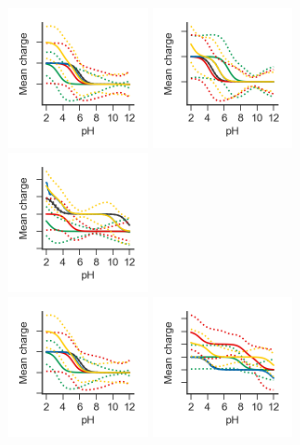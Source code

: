 \documentclass[9pt,lineno,final]{elife}
\begin{document}
\begin{figure}[H]
		\includegraphics[width=0.33\textwidth]{Reports/overview-virtual-titration-SM04.png}
	\includegraphics[width=0.33\textwidth]{Reports/overview-virtual-titration-SM05.png}
	\includegraphics[width=0.33\textwidth]{Reports/overview-virtual-titration-SM06.png}	 \\
		\includegraphics[width=0.33\textwidth]{Reports/overview-virtual-titration-SM07.png}
	\includegraphics[width=0.33\textwidth]{Reports/overview-virtual-titration-SM08.png}

\end{figure}
\end{document}
